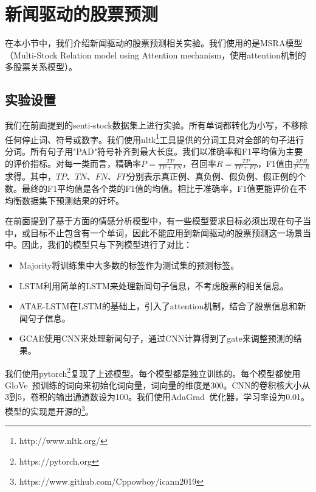 \section{新闻驱动的股票预测}
在本小节中，我们介绍新闻驱动的股票预测相关实验。我们使用的是MSRA模型（Multi-Stock Relation model using Attention mechanism，使用attention机制的多股票关系模型）。
\subsection{实验设置}
我们在前面提到的senti-stock数据集上进行实验。所有单词都转化为小写，不移除任何停止词、符号或数字。我们使用nltk\footnote{http://www.nltk.org/}工具提供的分词工具对全部的句子进行分词。所有句子用"PAD"符号补齐到最大长度。我们以准确率和F1平均值为主要的评价指标。对每一类而言，精确率$P=\frac{TP}{TP+FN}$，召回率$R=\frac{TP}{TP+FP}$，F1值由$\frac{2PR}{P+R}$求得。其中，$TP$、$TN$、$FN$、$FP$分别表示真正例、真负例、假负例、假正例的个数。最终的F1平均值是各个类的F1值的均值。相比于准确率，F1值更能评价在不均衡数据集下预测结果的好坏。

在前面提到了基于方面的情感分析模型中，有一些模型要求目标必须出现在句子当中，或目标不止包含有一个单词，因此不能应用到新闻驱动的股票预测这一场景当中。因此，我们的模型只与下列模型进行了对比：
\begin{itemize}
    \item Majority将训练集中大多数的标签作为测试集的预测标签。
    \item LSTM利用简单的LSTM来处理新闻句子信息，不考虑股票的相关信息。
    \item ATAE-LSTM在LSTM的基础上，引入了attention机制，结合了股票信息和新闻句子信息。
    \item GCAE使用CNN来处理新闻句子，通过CNN计算得到了gate来调整预测的结果。
\end{itemize}
我们使用pytorch\footnote{https://pytorch.org}复现了上述模型。每个模型都是独立训练的。每个模型都使用GloVe~\cite{pennington2014glove:}预训练的词向来初始化词向量，词向量的维度是300。CNN的卷积核大小从3到5，卷积的输出通道数设为100。我们使用AdaGrad~\cite{duchi2011adaptive}优化器，学习率设为0.01。模型的实现是开源的\footnote{https://www.github.com/Cppowboy/icann2019}。
